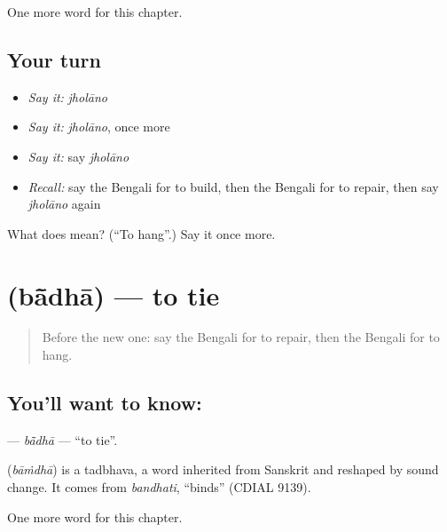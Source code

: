 \begin{grammarlens}[title={What you've built}]
One more word for this chapter.
\end{grammarlens}

\subsection*{Your turn}
\begin{itemize}
\raggedright
  \item \emph{Say it:} \emph{jholāno}
  \item \emph{Say it:} \emph{jholāno}, once more
  \item \emph{Say it:} say \emph{jholāno}
  \item \emph{Recall:} say the Bengali for to build, then the Bengali for to repair, then say \emph{jholāno} again
\end{itemize}

\begin{tcolorbox}[breakable,colback=teal!4,colframe=teal!35!black,title={Before you move on}]
What does  mean? (\textquotedblleft{}To hang\textquotedblright{}.) Say it once more.
\end{tcolorbox}
\section[\texorpdfstring{\bn{বাঁধা} (bā̃dhā)}{বাঁধা (bā̃dhā)}]{ (bā̃dhā) — to tie}

\label{lesson:BN-C151-badha}



\begin{quote}
Before the new one: say the Bengali for to repair, then the Bengali for to hang.
\end{quote}

\subsection*{You'll want to know: }
\textbf{} — \emph{bā̃dhā} — \textquotedblleft{}to tie\textquotedblright{}.

\begin{cousinweb}
\textbf{} (\emph{bāṁdhā}) is a tadbhava, a word inherited from Sanskrit and reshaped by sound change. It comes from \emph{bandhati}, \textquotedblleft{}binds\textquotedblright{} (CDIAL 9139).
\end{cousinweb}

\begin{grammarlens}[title={What you've built}]
One more word for this chapter.
\end{grammarlens}

